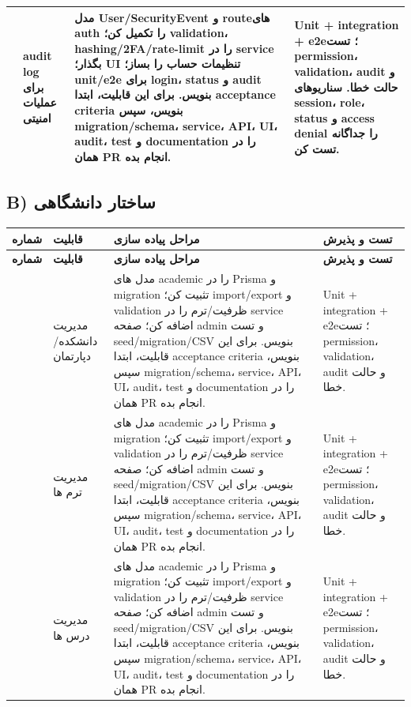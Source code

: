 \documentclass[11pt,a4paper]{article}
\begin{document}
\begin{longtable}{|>{\raggedleft\arraybackslash}p{}|>{\raggedleft\arraybackslash}p{}|>{\raggedleft\arraybackslash}p{}|>{\raggedleft\arraybackslash}p{}|}
20 & audit log برای عملیات امنیتی & مدل User/SecurityEvent و routeهای auth را تکمیل کن؛ validation، hashing/2FA/rate-limit را در service بگذار؛ UI تنظیمات حساب را بساز؛ unit/e2e برای login، status و audit بنویس. برای این قابلیت، ابتدا acceptance criteria بنویس، سپس migration/schema، service، API، UI، audit، test و documentation را در همان PR انجام بده. & Unit + integration + e2e؛ تست permission، validation، audit و حالت خطا. سناریوهای session، role، status و access denial را جداگانه تست کن. \\ \hline
\end{longtable}
\subsection{B) ساختار دانشگاهی}

\begin{longtable}{|>{\raggedleft\arraybackslash}p{}|>{\raggedleft\arraybackslash}p{}|>{\raggedleft\arraybackslash}p{}|>{\raggedleft\arraybackslash}p{}|}
\hline
\textbf{شماره} & \textbf{قابلیت} & \textbf{مراحل پیاده سازی} & \textbf{تست و پذیرش} \\\hline
\endfirsthead
\hline
\textbf{شماره} & \textbf{قابلیت} & \textbf{مراحل پیاده سازی} & \textbf{تست و پذیرش} \\\hline
\endhead
21 & مدیریت دانشکده/دپارتمان & مدل های academic را در Prisma و migration تثبیت کن؛ import/export و validation ظرفیت/ترم را در service اضافه کن؛ صفحه admin و تست seed/migration/CSV بنویس. برای این قابلیت، ابتدا acceptance criteria بنویس، سپس migration/schema، service، API، UI، audit، test و documentation را در همان PR انجام بده. & Unit + integration + e2e؛ تست permission، validation، audit و حالت خطا. \\ \hline
22 & مدیریت ترم ها & مدل های academic را در Prisma و migration تثبیت کن؛ import/export و validation ظرفیت/ترم را در service اضافه کن؛ صفحه admin و تست seed/migration/CSV بنویس. برای این قابلیت، ابتدا acceptance criteria بنویس، سپس migration/schema، service، API، UI، audit، test و documentation را در همان PR انجام بده. & Unit + integration + e2e؛ تست permission، validation، audit و حالت خطا. \\ \hline
23 & مدیریت درس ها & مدل های academic را در Prisma و migration تثبیت کن؛ import/export و validation ظرفیت/ترم را در service اضافه کن؛ صفحه admin و تست seed/migration/CSV بنویس. برای این قابلیت، ابتدا acceptance criteria بنویس، سپس migration/schema، service، API، UI، audit، test و documentation را در همان PR انجام بده. & Unit + integration + e2e؛ تست permission، validation، audit و حالت خطا. \\ \hline

\end{longtable}
\end{document}
